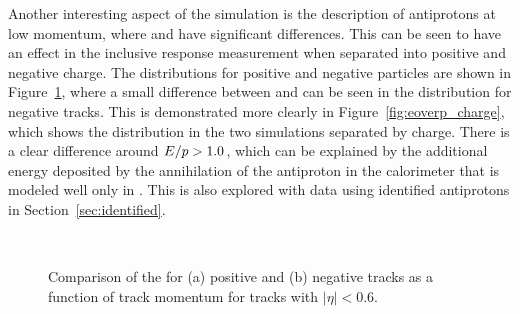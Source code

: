 Another interesting aspect of the simulation is the description of antiprotons at low momentum, where \QGSP and \FTFP have significant differences.
This can be seen to have an effect in the inclusive response measurement when separated into positive and negative charge.
The \epcor distributions for positive and negative particles are shown in Figure~\ref{fig:eoverp_corrected_charge}, where a small difference between \QGSP and \FTFP can be seen in the distribution for negative tracks.
This is demonstrated more clearly in Figure~\ref{fig:eoverp_charge}, which shows the \ep distribution in the two simulations separated by charge.
There is a clear difference around $E/p > 1.0$, which can be explained by the additional energy deposited by the annihilation of the antiproton in the calorimeter that is modeled well only in \FTFP.
This is also explored with data using identified antiprotons in Section~\ref{sec:identified}. 

\begin{figure}[h]
\centering
{}
~
\caption{Comparison of the \epcor for (a) positive and (b) negative tracks as a function of track momentum for tracks with $|\eta|<0.6$.}
\label{fig:eoverp_corrected_charge}
\end{figure}

